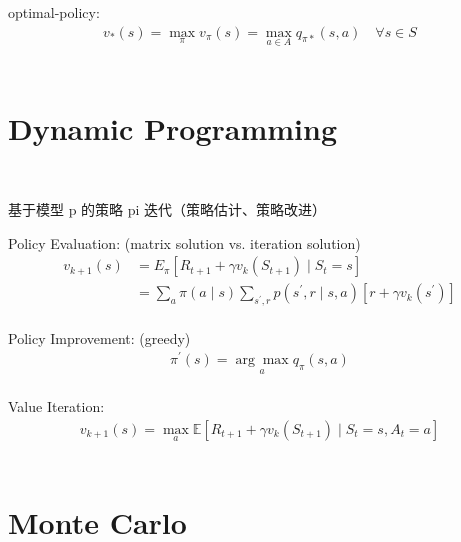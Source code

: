 \documentclass{article}
\begin{document}
optimal-policy: 
\begin{align*}
    v_{*}(s) = \max_{\pi} v_{\pi}(s)
    = \max_{a \in A} q_{\pi *}(s, a) 
    \quad \forall s \in S
\end{align*}
\\[6pt]


\newpage
\section{Dynamic Programming}


~ \\[6pt]
\begin{CJK}{UTF8}{gbsn}
    基于模型 p 的策略 pi 迭代（策略估计、策略改进） \\[6pt]
\end{CJK}


Policy Evaluation: (matrix solution vs. iteration solution)
\begin{align*}
    v_{k+1}(s) 
    &= {E}_{\pi} \left[ R_{t+1}+\gamma 
    v_{k} \left( S_{t+1} \right) \mid S_{t}=s \right] \\
    &= \sum_{a} \pi(a \mid s) \sum_{s^{\prime}, r} 
    p \left( s^{\prime}, r \mid s, a \right) 
    \left[ r+\gamma v_{k} \left( s^{\prime} \right) \right]
\end{align*}
\\[6pt]


Policy Improvement: (greedy)
\begin{align*}
    \pi^{\prime}(s) = \underset{a}{\arg \max} q_{\pi}(s, a)
\end{align*}
\\[6pt]


Value Iteration: \
\begin{align*}
    v_{k+1}(s)=\max_{a} \mathbb{E} \left[R_{t+1}+\gamma v_{k}\left(S_{t+1}\right) \mid S_{t}=s, A_{t}=a\right]
\end{align*}
\\


\section{Monte Carlo}
\end{document}

